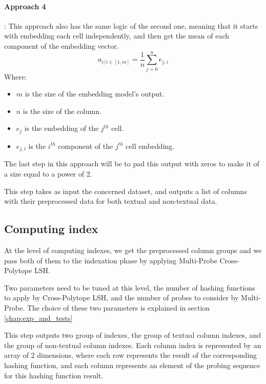 \paragraph{Approach 4}: This approach also has the same logic of the second one,
meaning that it starts with embedding each cell independently, and then get the
mean of each component of the embedding vector.
\begin{equation}
    a_{i / i \in [1, m]} = \frac{1}{n} \sum_{j=0}^{n} e_{j, i}
\end{equation}
Where:
\begin{multicols}{2}
    \begin{itemize}
        \item $m$ is the size of the embedding model's output.
        \item $n$ is the size of the column.
        \item $e_j$ is the embedding of the $j^{th}$ cell.
        \item $e_{j, i}$ is the $i^{th}$ component of the $j^{th}$ cell
        embedding.
    \end{itemize}
\end{multicols}

The last step in this approach will be to pad this output with zeros to make it
of a size equal to a power of 2.


This step takes as input the concerned dataset, and outputs a list of columns
with their preprocessed data for both textual and non-textual data.

\subsection{Computing index}
At the level of computing indexes, we get the preprocessed column groups and we
pass both of them to the indexation phase by applying Multi-Probe Cross-Polytope
LSH.

Two parameters need to be tuned at this level, the number of hashing functions
to apply by Cross-Polytope LSH, and the number of probes to consider by
Multi-Probe. The choice of these two parameters is explained in section
\ref{chap:exp_and_tests}

This step outputs two group of indexes, the group of textual column indexes, and
the group of non-textual column indexes. Each column index is represented by an
array of 2 dimensions, where each row represents the result of the corresponding
hashing function, and each column represents an element of the probing sequence
for this hashing function result.

